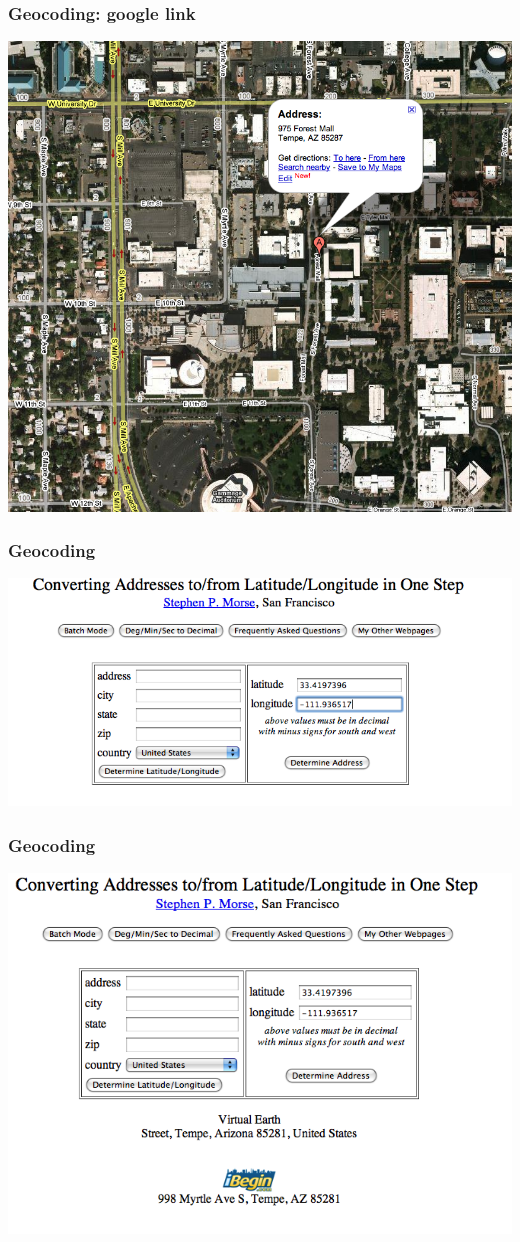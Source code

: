 \documentclass[nototal]{beamer}
\begin{document}
\begin{frame}
	\frametitle{Geocoding: google link}
    \begin{center}
      \includegraphics[width=.65\linewidth]{geocode3.png}
    \end{center}
 \end{frame} 

\begin{frame}
	\frametitle{Geocoding}
    \begin{center}
      \includegraphics[width=.65\linewidth]{geocode4.png}
    \end{center}
 \end{frame} 

\begin{frame}
	\frametitle{Geocoding}
    \begin{center}
      \includegraphics[width=.65\linewidth]{geocode5.png}
    \end{center}
 \end{frame} 
\end{document}
